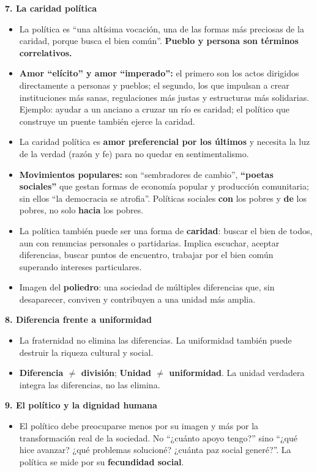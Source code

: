 \documentclass[10pt,a4paper]{article}
\begin{document}
\medskip\noindent \textbf{7. La caridad política}\par\nopagebreak
\begin{itemize}
\item La política es ``una altísima vocación, una de las formas más preciosas de la caridad, porque busca el bien común''. \textbf{Pueblo y persona son términos correlativos.}
\item \textbf{Amor ``elícito'' y amor ``imperado'':} el primero son los actos dirigidos directamente a personas y pueblos; el segundo, los que impulsan a crear instituciones más sanas, regulaciones más justas y estructuras más solidarias. Ejemplo: ayudar a un anciano a cruzar un río es caridad; el político que construye un puente también ejerce la caridad.
\item La caridad política es \textbf{amor preferencial por los últimos} y necesita la luz de la verdad (razón y fe) para no quedar en sentimentalismo.
\item \textbf{Movimientos populares:} son ``sembradores de cambio'', \textbf{``poetas sociales''} que gestan formas de economía popular y producción comunitaria; sin ellos ``la democracia se atrofia''. Políticas sociales \textbf{con} los pobres y \textbf{de} los pobres, no solo \textbf{hacia} los pobres.
\item La política también puede ser una forma de \textbf{caridad}: buscar el bien de todos, aun con renuncias personales o partidarias. Implica escuchar, aceptar diferencias, buscar puntos de encuentro, trabajar por el bien común superando intereses particulares.
\item Imagen del \textbf{poliedro}: una sociedad de múltiples diferencias que, sin desaparecer, conviven y contribuyen a una unidad más amplia.
\end{itemize}

\medskip\noindent \textbf{8. Diferencia frente a uniformidad}\par\nopagebreak
\begin{itemize}
\item La fraternidad no elimina las diferencias. La uniformidad también puede destruir la riqueza cultural y social.
\item \textbf{Diferencia $\neq$ división}; \textbf{Unidad $\neq$ uniformidad}. La unidad verdadera integra las diferencias, no las elimina.
\end{itemize}

\medskip\noindent \textbf{9. El político y la dignidad humana}\par\nopagebreak
\begin{itemize}
\item El político debe preocuparse menos por su imagen y más por la transformación real de la sociedad. No ``¿cuánto apoyo tengo?'' sino ``¿qué hice avanzar? ¿qué problemas solucioné? ¿cuánta paz social generé?''. La política se mide por su \textbf{fecundidad social}.
\end{itemize}
\end{document}
